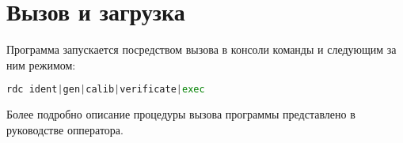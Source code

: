 \newpage
\section{Вызов и загрузка}

Программа запускается посредством вызова в консоли команды и следующим за ним режимом:
\begin{lstlisting}[language=python, numbers=none, frame=single]
rdc ident|gen|calib|verificate|exec
\end{lstlisting}
Более подробно описание процедуры вызова программы представлено в руководстве опператора.